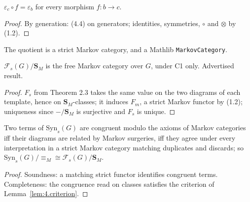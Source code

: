 \begin{lemma}
\label{lem:4.natural}
\leanok
{}
$\varepsilon_c \circ f = \varepsilon_b$ for every morphism $f : b \to c$.
\end{lemma}
\begin{proof}
\leanok
By generation: (4.4) on generators; identities, symmetries, $\circ$ and $\otimes$ by (1.2).
\end{proof}

\begin{theorem}
\label{thm:4.markov}
\leanok
{}
The quotient is a strict Markov category, and a Mathlib \texttt{MarkovCategory}.
\end{theorem}

\begin{theorem}[Theorem 4.1]
\label{thm:4.1}
\leanok
{}
$\mathcal F_s(G)/\mathbf S_M$ is the free Markov category over $G$, under C1 only.
Advertised result.
\end{theorem}
\begin{proof}
\leanok
$F_s$ from Theorem 2.3 takes the same value on the two diagrams of each template, hence
on $\mathbf S_M$-classes; it induces $F_m$, a strict Markov functor by (1.2); uniqueness
since $- / \mathbf S_M$ is surjective and $F_s$ is unique.
\end{proof}

\begin{remark}[Remark 4.2]
\label{rem:4.2}
\leanok
{}
Two terms of $\mathrm{Syn}_s(G)$ are congruent modulo the axioms of Markov categories iff
their diagrams are related by Markov surgeries, iff they agree under every interpretation
in a strict Markov category matching duplicates and discards; so
$\mathrm{Syn}_s(G)/{\equiv_M} \cong \mathcal F_s(G)/\mathbf S_M$.
\end{remark}
\begin{proof}
\leanok
Soundness: a matching strict functor identifies congruent terms.  Completeness: the
congruence read on classes satisfies the criterion of Lemma~\ref{lem:4.criterion}.
\end{proof}

